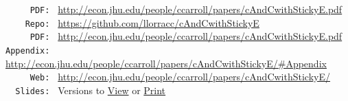 \begin{adjustwidth}{-1em}{-1em}
\parbox{\textwidth}{
  \begin{center}
\begin{tabbing}
  \texttt{~~~~~PDF:~} \= \= \url{http://econ.jhu.edu/people/ccarroll/papers/cAndCwithStickyE.pdf} \kill \\  %
\texttt{~~~~Repo:~} \= \= \url{https://github.com/llorracc/cAndCwithStickyE}  \\
\texttt{~~~~~PDF:~} \> \> \url{http://econ.jhu.edu/people/ccarroll/papers/cAndCwithStickyE.pdf} \\
\texttt{Appendix:~} \> \> \url{http://econ.jhu.edu/people/ccarroll/papers/cAndCwithStickyE/\#Appendix} \\
\texttt{~~~~~Web:~} \> \> \url{http://econ.jhu.edu/people/ccarroll/papers/cAndCwithStickyE/} \\
\texttt{~~Slides:~} \> \> Versions to \href{http://econ.jhu.edu/people/ccarroll/papers/cAndCwithStickyE-Slides.pdf}{View} or \href{http://econ.jhu.edu/people/ccarroll/papers/cAndCwithStickyE-Slides-Print.pdf}{Print} \\
\end{tabbing}
\end{center}
}


\end{adjustwidth}
